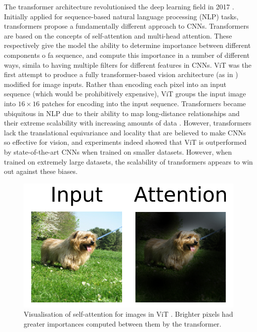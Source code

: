 \documentclass[a4paper,12pt]{report}
\begin{document}
The transformer architecture revolutionised the deep learning field in 2017 \cite{vaswani_attention_2017}. Initially applied for sequence-based natural language processing (NLP) tasks, transformers propose a fundamentally different approach to CNNs. Transformers are based on the concepts of self-attention and multi-head attention. These respectively give the model the ability to determine importance between different components o fa sequence, and compute this importance in a number of different ways, simila to having multiple filters for different features in CNNs. ViT \cite{dosovitskiy_image_2021} was the first attempt to produce a fully transformer-based vision architecture (as in \cite{vaswani_attention_2017}) modified for image inputs. Rather than encoding each pixel into an input sequence (which would be prohibitively expensive), ViT groups the input image into $16 \times 16$ patches for encoding into the input sequence. Transformers became ubiquitous in NLP due to their ability to map long-distance relationships and their extreme scalability with increasing amounts of data \cite{devlin_bert_2019} \cite{radford_language_2019}. However, transformers lack the translational equivariance and locality that are believed to make CNNs so effective for vision, and experiments indeed showed that ViT is outperformed by state-of-the-art CNNs when trained on smaller datasets. However, when trained on extremely large datasets, the scalability of transformers appears to win out against these biases.

\begin{figure}[h]
    \centering
    \includegraphics[scale=0.5]{res/vit-attention.png}
    \caption{Visualisation of self-attention for images in ViT \cite{dosovitskiy_image_2021}. Brighter pixels had greater importances computed between them by the transformer.}
    \label{fig:vit_attention}
\end{figure}
\end{document}
